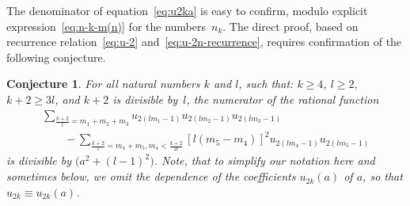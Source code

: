 \documentclass[pdftex]{sigma}
\numberwithin{equation}{section}
\newtheorem{Conjecture}[Theorem]{Conjecture}
\begin{document}
\begin{Remark}\label{rem:coeff-denom-conjecture}
The denominator of equation~\eqref{eq:u2ka} is easy to confirm, modulo explicit expression~\eqref{eq:n-k-m(n)}
for the numbers~$n_k$. The direct proof, based on recurrence relation~\eqref{eq:u-2}
and~\eqref{eq:u-2n-recurrence}, requires confirmation of the following conjecture.
\end{Remark}

\begin{Conjecture}\label{con:strange-divisibility}
For all natural numbers $k$ and $l$, such that: $k\geq4$, $l\geq2$, $k+2\geq3l$, and $k+2$ is divisible by~$l$,
the numerator of the rational function
\begin{gather*}
\sum\limits_{\frac{k+2}l=m_1+m_2+m_3}u_{2(lm_1-1)}u_{2(lm_2-1)}u_{2(lm_3-1)}\nonumber\\
\qquad{} -\sum\limits_{\frac{k+2}l=m_4+m_5, m_4<\frac{k+2}{2l}}\left[l(m_5-m_4)\right]^2u_{2(lm_4-1)}u_{2(lm_5-1)}%
\end{gather*}
is divisible by $\big(a^2+(l-1)^2\big)$. Note, that to simplify our notation here and sometimes below, we omit the dependence of the coefficients $u_{2k}(a)$ of $a$, so that $u_{2k}\equiv u_{2k}(a)$.
\end{Conjecture}
\end{document}
